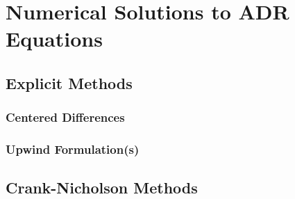 \section{Numerical Solutions to ADR Equations}
\subsection{Explicit Methods}
\subsubsection{Centered Differences}
\subsubsection{Upwind Formulation(s)}
\subsection{Crank-Nicholson Methods}
